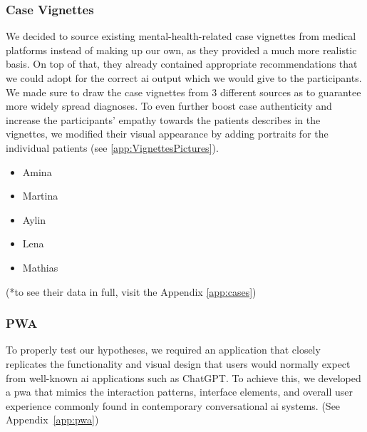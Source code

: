 \documentclass[sigconf,natbib=false]{acmart}
\begin{document}
\subsubsection{Case Vignettes}
\label{sec:cases}

We decided to source existing mental-health-related case vignettes from medical platforms instead of making up our own, as they provided a much more realistic basis.
On top of that, they already contained appropriate recommendations that we could adopt for the correct \gls{ai} output which we would give to the participants.
We made sure to draw the case vignettes from 3 different sources as to guarantee more widely spread diagnoses.
To even further boost case authenticity and increase the participants' empathy towards the patients describes in the vignettes, we modified their visual appearance by adding portraits for the individual patients (see \ref{app:VignettesPictures}).



\begin{itemize}
\item Amina \autocite[slide~8]{dbjr_stoerungsbilder}

\item Martina \autocite[\#tab\_fallbeispiel]{theraphysia_mentale_gesundheit}

\item Aylin \autocite[slide~15]{dbjr_stoerungsbilder}

\item Lena \autocite[slide~26]{dbjr_stoerungsbilder}

\item Mathias \autocite[p~1]{bar_fallbeispiel_psyche_psychosomatik}
\end{itemize}
(*to see their data in full, visit the Appendix \ref{app:cases})


\subsubsection{PWA}
\label{sec:pwa}

To properly test our hypotheses, we required an application that closely replicates the functionality and visual design that users would normally expect from well-known \Gls{ai} applications such as ChatGPT.
To achieve this, we developed a \Gls{pwa} that mimics the interaction patterns, interface elements, and overall user experience commonly found in contemporary conversational \Gls{ai} systems.
(See Appendix~\ref{app:pwa})
\end{document}
